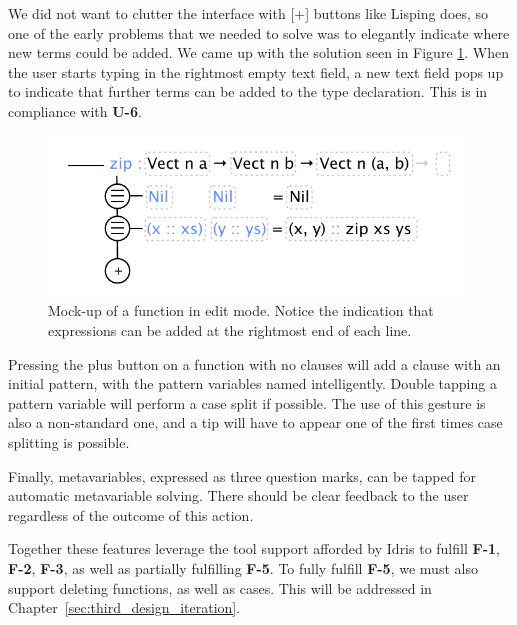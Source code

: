 
We did not want to clutter the interface with [+] buttons like Lisping does, so one of the early problems that we needed to solve was to elegantly indicate where new terms could be added.
We came up with the solution seen in Figure \ref{fig:initial_function_editing_design}.
When the user starts typing in the rightmost empty text field, a new text field pops up to indicate that further terms can be added to the type declaration. This is in compliance with \textbf{U-6}.

\begin{figure}
	\centering
		\includegraphics[width=110mm]{diagrams/initial_function_editing_design.pdf}
	\caption{Mock-up of a function in edit mode. Notice the indication that expressions can be
	added at the rightmost end of each line.}
\label{fig:initial_function_editing_design}
\end{figure}

Pressing the plus button on a function with no clauses will add a clause with an initial pattern, with the pattern variables named intelligently. 
Double tapping a pattern variable will perform a case split if possible. 
The use of this gesture is also a non-standard one, and a tip will have to appear one of the first times case splitting is possible.

Finally, metavariables, expressed as three question marks, can be tapped for automatic metavariable solving. 
There should be clear feedback to the user regardless of the outcome of this action.

Together these features leverage the tool support afforded by Idris to fulfill \textbf{F-1}, \textbf{F-2}, \textbf{F-3}, as well as partially fulfilling \textbf{F-5}. To fully fulfill \textbf{F-5}, we must also support deleting functions, as well as cases. This will be addressed in
Chapter~\ref{sec:third_design_iteration}.

